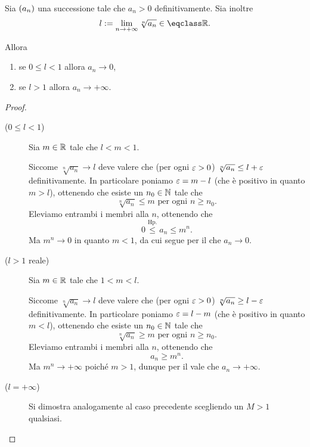 \begin{proposition}
     \label{prop:crit_radice_succ}
    Sia $\seqn*{a}$ una successione tale che $a_n > 0$ definitivamente. Sia inoltre \[
        l \deq \lim_{n \to +\infty} \sqrt[n]{a_{n}} \in \closure{\R}.    
    \]

    Allora \begin{enumerate}[label={(\roman*)}, ref={criterio della radice (\theproposition): (\roman*)}]
        \item se $0 \leq l < 1$ allora $a_n \to 0$,
        \item se $l > 1$ allora $a_n \to +\infty$.
    \end{enumerate}
\end{proposition}
\begin{proof}
    \begin{description}
        \item[($0 \leq l < 1$)] Sia $m \in \mathbb{R}$ tale che $l < m < 1$.
        
        Siccome $\sqrt[n]{a_n} \to l$ deve valere che (per ogni $\varepsilon > 0$) $\sqrt[n]{a_n} \leq l + \varepsilon$ definitivamente. In particolare poniamo $\varepsilon = m - l$ (che è positivo in quanto $m > l$), ottenendo che esiste un $n_0 \in \mathbb{N}$ tale che \[
            \sqrt[n]{a_n} \leq m \text{    per ogni } n \geq n_0.
        \] Eleviamo entrambi i membri alla $n$, ottenendo che \[
            0 \stackrel{\text{Hp.}}{\leq} a_n \leq m^n.    
        \] Ma $m^n \to 0$ in quanto $m < 1$, da cui segue per il  che $a_n \to 0$.
        \item[($l > 1$ reale)] Sia $m \in \mathbb{R}$ tale che $1 < m < l$.
        
        Siccome $\sqrt[n]{a_n} \to l$ deve valere che (per ogni $\varepsilon > 0$) $\sqrt[n]{a_n} \geq l - \varepsilon$ definitivamente. In particolare poniamo $\varepsilon = l - m$ (che è positivo in quanto $m < l$), ottenendo che esiste un $n_0 \in \mathbb{N}$ tale che \[
            \sqrt[n]{a_n} \geq m \text{    per ogni } n \geq n_0.
        \] Eleviamo entrambi i membri alla $n$, ottenendo che \[
            a_n \geq m^n.    
        \] Ma $m^n \to +\infty$ poiché $m > 1$, dunque per il  vale che $a_n \to +\infty$.
        \item[($l = +\infty$)] Si dimostra analogamente al caso precedente scegliendo un $M > 1$ qualsiasi. \qedhere
    \end{description} 
\end{proof}

